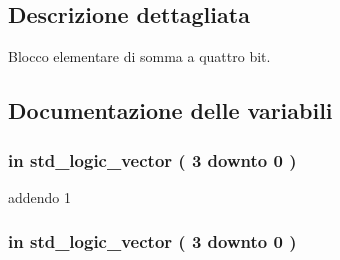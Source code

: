 \subsection{Descrizione dettagliata}
Blocco elementare di somma a quattro bit. 



\subsection{Documentazione delle variabili}
\hypertarget{group___nibble_adder_ga2c8945f4747b9a5448412c95fc281c87}{
\subsubsection[{addendum1}]{ {\bfseries \textcolor{vhdlchar}{in}\textcolor{vhdlchar}{ }} {\bfseries \textcolor{vhdlchar}{std\+\_\+logic\+\_\+vector}\textcolor{vhdlchar}{ }\textcolor{vhdlchar}{(}\textcolor{vhdlchar}{ }\textcolor{vhdlchar}{ } \textcolor{vhdldigit}{3} \textcolor{vhdlchar}{ }\textcolor{vhdlchar}{downto}\textcolor{vhdlchar}{ }\textcolor{vhdlchar}{ } \textcolor{vhdldigit}{0} \textcolor{vhdlchar}{ }\textcolor{vhdlchar}{)}\textcolor{vhdlchar}{ }} \hspace{0.3cm}{\ttfamily [Port]}}}\label{group___nibble_adder_ga2c8945f4747b9a5448412c95fc281c87}


addendo 1 

\hypertarget{group___nibble_adder_gad1fa6d9d78208885ad2f4c417fc4b530}{
\subsubsection[{addendum2}]{ {\bfseries \textcolor{vhdlchar}{in}\textcolor{vhdlchar}{ }} {\bfseries \textcolor{vhdlchar}{std\+\_\+logic\+\_\+vector}\textcolor{vhdlchar}{ }\textcolor{vhdlchar}{(}\textcolor{vhdlchar}{ }\textcolor{vhdlchar}{ } \textcolor{vhdldigit}{3} \textcolor{vhdlchar}{ }\textcolor{vhdlchar}{downto}\textcolor{vhdlchar}{ }\textcolor{vhdlchar}{ } \textcolor{vhdldigit}{0} \textcolor{vhdlchar}{ }\textcolor{vhdlchar}{)}\textcolor{vhdlchar}{ }} \hspace{0.3cm}{\ttfamily [Port]}}}\label{group___nibble_adder_gad1fa6d9d78208885ad2f4c417fc4b530}


